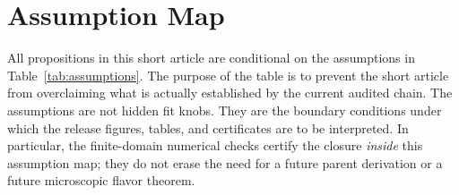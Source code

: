 \documentclass[pdflatex,sn-mathphys-num,iicol]{sn-jnl}
\begin{document}
\section{Assumption Map}
\label{sec:assumptions}

All propositions in this short article are conditional on the assumptions in Table~\ref{tab:assumptions}.
The purpose of the table is to prevent the short article from overclaiming what is actually established by the current audited chain.
The assumptions are not hidden fit knobs.
They are the boundary conditions under which the release figures, tables, and certificates are to be interpreted.
In particular, the finite-domain numerical checks certify the closure \emph{inside} this assumption map; they do not erase the need for a future parent derivation or a future microscopic flavor theorem.
\end{document}
